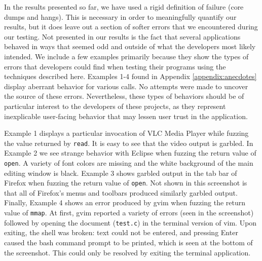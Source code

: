 In the results presented so far, we have used a rigid definition of failure (core dumps and hangs). This is necessary in order to meaningfully quantify our results, but it does leave out a section of softer errors that we encountered during our testing. Not presented in our results is the fact that several applications behaved in ways that seemed odd and outside of what the developers most likely intended. We include a few examples primarily because they show the types of errors that developers could find when testing their programs using the techniques described here. Examples 1-4 found in Appendix \ref{appendix:anecdotes} display aberrant behavior for various calls. No attempts were made to uncover the source of these errors. Nevertheless, these types of behaviors should be of particular interest to the developers of these projects, as they represent inexplicable user-facing behavior that may lessen user trust in the application.

Example 1 displays a particular invocation of VLC Media Player while fuzzing the value returned by \texttt{read}. It is easy to see that the video output is garbled. In Example 2 we see strange behavior with Eclipse when fuzzing the return value of \texttt{open}. A variety of font colors are missing and the white background of the main editing window is black. Example 3 shows garbled output in the tab bar of Firefox when fuzzing the return value of \texttt{open}. Not shown in this screenshot is that all of Firefox's menus and toolbars produced similarly garbled output. Finally, Example 4 shows an error produced by gvim when fuzzing the return value of \texttt{mmap}. At first, gvim reported a variety of errors (seen in the screenshot) followed by opening the document (\texttt{test.c}) in the terminal version of vim. Upon exiting, the shell was broken: text could not be entered, and pressing Enter caused the bash command prompt to be printed, which is seen at the bottom of the screenshot. This could only be resolved by exiting the terminal application.